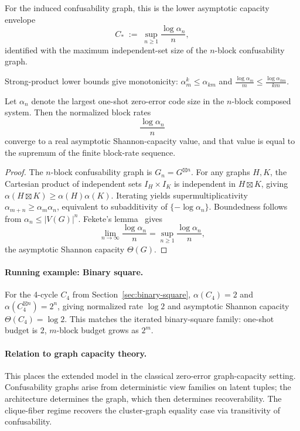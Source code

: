 For the induced confusability graph, this is the lower asymptotic capacity envelope
\[
C_* \;:=\; \sup_{n\ge 1} \frac{\log \alpha_n}{n},
\]
identified with the maximum independent-set size of the $n$-block confusability graph.

Strong-product lower bounds give monotonicity: $\alpha_m^k \le \alpha_{km}$ and $\frac{\log \alpha_m}{m} \le \frac{\log \alpha_{km}}{km}$.

\begin{theorem}\label{thm:asymptotic-capacity}
Let $\alpha_n$ denote the largest one-shot zero-error code size in the $n$-block composed system. Then the normalized block rates
\[
\frac{\log \alpha_n}{n}
\]
converge to a real asymptotic Shannon-capacity value, and that value is equal to the supremum of the finite block-rate sequence.
\end{theorem}

\begin{proof}
The $n$-block confusability graph is $G_n = G^{\boxtimes n}$. For any graphs $H,K$, the Cartesian product of independent sets $I_H\times I_K$ is independent in $H\boxtimes K$, giving $\alpha(H\boxtimes K)\ge\alpha(H)\alpha(K)$. Iterating yields supermultiplicativity $\alpha_{m+n}\ge\alpha_m\alpha_n$, equivalent to subadditivity of $\{-\log\alpha_n\}$. Boundedness follows from $\alpha_n\le|V(G)|^n$. Fekete's lemma~\cite{fekete1923uber} gives
\[
\lim_{n\to\infty}\frac{\log\alpha_n}{n}=\sup_{n\ge1}\frac{\log\alpha_n}{n},
\]
the asymptotic Shannon capacity $\Theta(G)$.
\end{proof}

\paragraph{Running example: Binary square.}
For the 4-cycle $C_4$ from Section~\ref{sec:binary-square}, $\alpha(C_4) = 2$ and $\alpha(C_4^{\boxtimes n}) = 2^n$, giving normalized rate $\log 2$ and asymptotic Shannon capacity $\Theta(C_4) = \log 2$. This matches the iterated binary-square family: one-shot budget is $2$, $m$-block budget grows as $2^m$.

\paragraph{Relation to graph capacity theory.}
This places the extended model in the classical zero-error graph-capacity setting. Confusability graphs arise from deterministic view families on latent tuples; the architecture determines the graph, which then determines recoverability. The clique-fiber regime recovers the cluster-graph equality case via transitivity of confusability.
